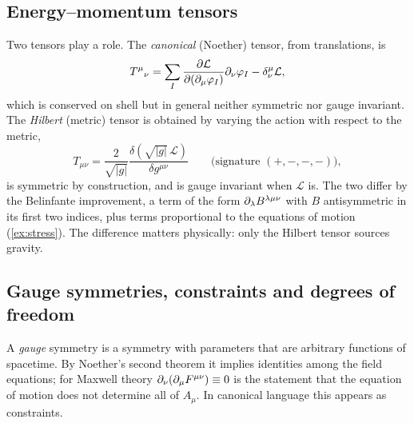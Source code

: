 \subsection{Energy--momentum tensors}
\label{sec:fw-T}

Two tensors play a role. The \emph{canonical} (Noether) tensor, from translations, is
\begin{equation}
T^\mu{}_\nu=\sum_I\frac{\partial\mathcal L}{\partial(\partial_\mu\varphi_I)}\partial_\nu\varphi_I-\delta^\mu_\nu\mathcal L,
\label{eq:Tcan}
\end{equation}
which is conserved on shell but in general neither symmetric nor gauge invariant. The \emph{Hilbert} (metric) tensor is obtained by varying the action with respect to the metric,
\begin{equation}
T_{\mu\nu}=\frac{2}{\sqrt{|g|}}\frac{\delta(\sqrt{|g|}\,\mathcal L)}{\delta g^{\mu\nu}}\qquad\text{(signature }(+,-,-,-)\text{)},
\label{eq:Thilb}
\end{equation}
is symmetric by construction, and is gauge invariant when $\mathcal L$ is. The two differ by the Belinfante improvement, a term of the form $\partial_\lambda B^{\lambda\mu\nu}$ with $B$ antisymmetric in its first two indices, plus terms proportional to the equations of motion (\cref{ex:stress}). The difference matters physically: only the Hilbert tensor sources gravity.

\subsection{Gauge symmetries, constraints and degrees of freedom}
\label{sec:fw-dirac}

A \emph{gauge} symmetry is a symmetry with parameters that are arbitrary functions of spacetime. By Noether's second theorem it implies identities among the field equations; for Maxwell theory $\partial_\nu(\partial_\mu F^{\mu\nu})\equiv0$ is the statement that the equation of motion does not determine all of $A_\mu$. In canonical language this appears as constraints.

